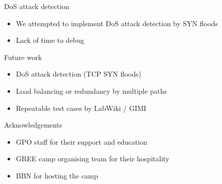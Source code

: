 \documentclass{beamer}
\begin{document}
\begin{frame}{DoS attack detection}
\begin{itemize}
\item We attempted to implement DoS attack detection by SYN floods
\item Lack of time to debug
\end{itemize}
\end{frame}

\begin{frame}{Future work}
\begin{itemize}
\item DoS attack detection (TCP SYN floods)
\item Load balancing or redundancy by multiple paths
\item Repeatable test cases by LabWiki / GIMI
\end{itemize}
\end{frame}

\begin{frame}{Acknowledgements}
\begin{itemize}
\item GPO staff for their support and education
\item GREE camp organising team for their hospitality
\item BBN for hosting the camp
\end{itemize}
\end{frame}
\end{document}
